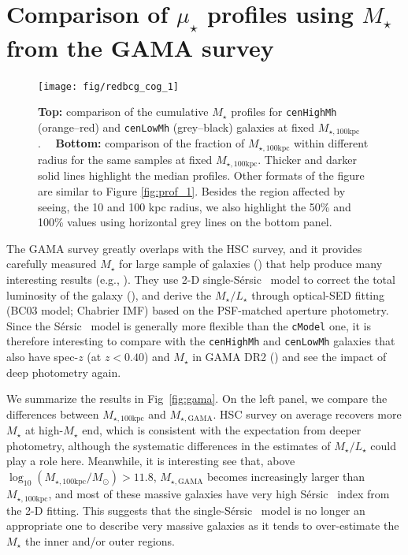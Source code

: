 \documentclass[a4paper,fleqn,usenatbib]{mnras}
\def\ser{{S\'{e}rsic\ }}
\def\rbcg{\texttt{cenHighMh}}
\def\nbcg{\texttt{cenLowMh}}
\def\mstar{{$M_{\star}$}}
\def\mtot{{$M_{\star,100\mathrm{kpc}}$}}
\def\mgama{{$M_{\star,\mathrm{GAMA}}$}}
\def\logmtot{{$\log_{10} (M_{\star,100\mathrm{kpc}}/M_{\odot})$}}
\def\m2l{{$M_{\star}/L_{\star}$}}
\def\mden{{$\mu_{\star}$}}
\begin{document}
\section{Comparison of \mden{} profiles using \mstar{} from the GAMA survey}
    \label{app:gama} 

\begin{figure}
    \centering
    \texttt{[image: fig/redbcg\_cog\_1]}
    \caption{
        \textbf{Top:} comparison of the cumulative \mstar{} profiles for 
        \rbcg{} (orange--red) and \nbcg{} (grey--black) galaxies at fixed \mtot{}.~~
        \textbf{Bottom:} comparison of the fraction of \mtot{} within different radius 
        for the same samples at fixed \mtot{}. 
        Thicker and darker solid lines highlight the median profiles. 
        Other formats of the figure are similar to Figure \ref{fig:prof_1}. 
        Besides the region affected by seeing, the 10 and 100 kpc radius, we 
        also highlight the 50\% and 100\% values using horizontal grey lines on the 
        bottom panel. 
        }
    \label{fig:cog}
\end{figure}
    
    The GAMA survey greatly overlaps with the HSC survey, and it provides carefully 
    measured \mstar{} for large sample of galaxies (\citealt{Taylor2011}) that help 
    produce many interesting results (e.g., \citealt{Bauer2013, Ferreras2017}).
    They use 2-D single-\ser{} model to correct the total luminosity of the galaxy 
    (\citealt{Kelvin2012}), and derive the \m2l{} through optical-SED fitting 
    (BC03 model; Chabrier IMF) based on the PSF-matched aperture photometry. 
    Since the \ser{} model is generally more flexible than the \texttt{cModel} one, 
    it is therefore interesting to compare with the \rbcg{} and \nbcg{} galaxies 
    that also have spec-$z$ (at $z < 0.40$) and \mstar{} in GAMA DR2 
    (\citealt{Liske2015}) and see the impact of deep photometry again. 
    
    We summarize the results in Fig~\ref{fig:gama}.  
    On the left panel, we compare the differences between \mtot{} and \mgama{}. 
    HSC survey on average recovers more \mstar{} at high-\mstar{} end, which is 
    consistent with the expectation from deeper photometry, although the 
    systematic differences in the estimates of \m2l{} could play a role here. 
    Meanwhile, it is interesting see that, above \logmtot{}$> 11.8$, \mgama{} 
    becomes increasingly larger than \mtot{}, and most of these massive 
    galaxies have very high \ser{} index from the 2-D fitting. 
    This suggests that the single-\ser{} model is no longer an appropriate one to 
    describe very massive galaxies as it tends to over-estimate the \mstar{} the 
    inner and/or outer regions. 
    
\end{document}
